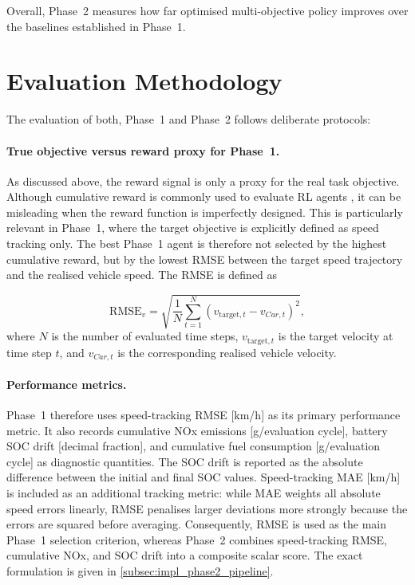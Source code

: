 Overall, Phase~2 measures how far optimised multi-objective policy improves over the baselines established in Phase~1.

\section{Evaluation Methodology}
\label{sec:method_evaluation}
The evaluation of both, Phase~1 and Phase~2 follows deliberate protocols:

\paragraph{True objective versus reward proxy for Phase~1.}
As discussed above, the reward signal is only a proxy for the real task objective. Although cumulative reward is commonly used to evaluate \ac{RL} agents \cite{sutton_reinforcement_2020}, it can be misleading when the reward function is imperfectly designed. This is particularly relevant in Phase~1, where the target objective is explicitly defined as speed tracking only. The best Phase~1 agent is therefore not selected by the highest cumulative reward, but by the lowest \ac{RMSE} between the target speed trajectory and the realised vehicle speed. The \ac{RMSE} is defined as

\begin{equation}
  \mathrm{RMSE}_v = \sqrt{\frac{1}{N}\sum_{t=1}^{N}\left(v_{\mathrm{target},t} - v_{Car,t}\right)^2},
\end{equation}
where $N$ is the number of evaluated time steps, $v_{\mathrm{target},t}$ is the target velocity at time step $t$, and $v_{Car,t}$ is the corresponding realised vehicle velocity.

\paragraph{Performance metrics.}
Phase~1 therefore uses speed-tracking \ac{RMSE} [km/h] as its primary performance metric. It also records cumulative \ac{NOx} emissions [g/evaluation cycle], battery \ac{SOC} drift [decimal fraction], and cumulative fuel consumption [g/evaluation cycle] as diagnostic quantities. The \ac{SOC} drift is reported as the absolute difference between the initial and final \ac{SOC} values. Speed-tracking \ac{MAE} [km/h] is included as an additional tracking metric: while \ac{MAE} weights all absolute speed errors linearly, \ac{RMSE} penalises larger deviations more strongly because the errors are squared before averaging. Consequently, \ac{RMSE} is used as the main Phase~1 selection criterion, whereas Phase~2 combines speed-tracking \ac{RMSE}, cumulative \ac{NOx}, and \ac{SOC} drift into a composite scalar score. The exact formulation is given in \autoref{subsec:impl_phase2_pipeline}.


